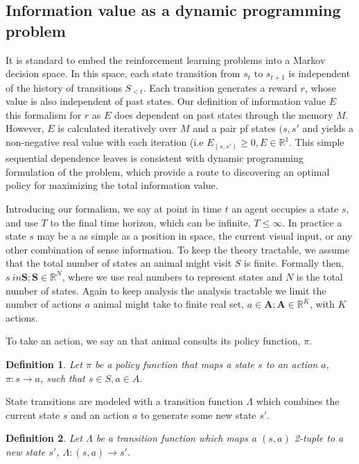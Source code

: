 \documentclass[9pt,twocolumn,twoside]{pnas-new}
\newtheorem{definition}{Definition}
\begin{document}
\subsection*{Information value as a dynamic programming problem}
It is standard to embed the reinforcement learning problems into a Markov decision space. In this space, each state transition from $s_t$ to $s_{t+1}$ is independent of the history of transitions $S_{<t}$. Each transition generates a reward $r$, whose value is also independent of past states. Our definition of information value $E$ this formalism for $r$ as $E$ does dependent on past states through the memory $M$. However, $E$ is calculated iteratively over $M$ and a pair pf states $(s, s'$ and yields a non-negative real value with each iteration (i.e $E_{(s,s')} \ge 0, E \in \mathbb{R}^1$.  This simple sequential dependence leaves is consistent with dynamic programming formulation of the problem, which provide a route to discovering an optimal policy for maximizing the total information value. 

Introducing our formalism, we say at point in time $t$ an agent occupies a state $s$, and use $T$ to the final time horizon, which can be infinite, $T \leq \infty$. In practice a state $s$ may be a as simple as a position in space, the current visual input, or any other combination of sense information. To keep the theory tractable, we assume that the total number of states an animal might visit $S$ is finite. Formally then, $s\ in \textbf{S}; \textbf{S} \in \mathbb{R}^N$, where we use real numbers to represent states and $N$ is the total number of states. Again to keep analysis the analysis tractable we limit the number of actions $a$ animal might take to finite real set, $a \in \textbf{A}; \textbf{A} \in \mathbb{R}^K$, with $K$ actions. 

To take an action, we say an that animal consults its policy function, $\pi$. 

\begin{definition}
    Let $\pi$ be a policy function that maps a state $s$ to an action $a$, $\pi : s \rightarrow a$, such that $s \in S, a \in A$.
\end{definition}

State transitions are modeled with a transition function $\Lambda$ which combines the current state $s$ and an action $a$ to generate some new state $s'$.

\begin{definition}
    Let $\Lambda$ be a transition function which maps a $(s,a)$ 2-tuple to a new state $s'$, $\Lambda : (s, a) \rightarrow s'$.     
\end{definition}
\end{document}
